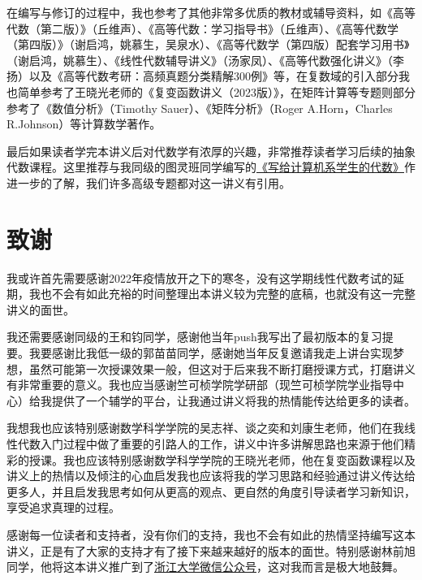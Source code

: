 在编写与修订的过程中，我也参考了其他非常多优质的教材或辅导资料，如《高等代数（第二版）》（丘维声）、《高等代数：学习指导书》（丘维声）、《高等代数学（第四版）》（谢启鸿，姚慕生，吴泉水）、《高等代数学（第四版）配套学习用书》（谢启鸿，姚慕生）、《线性代数辅导讲义》（汤家凤）、《高等代数强化讲义》（李扬）以及《高等代数考研：高频真题分类精解300例》等，在复数域的引入部分我也简单参考了王晓光老师的《复变函数讲义（2023版）》，在矩阵计算等专题则部分参考了《数值分析》（Timothy Sauer）、《矩阵分析》（Roger A.Horn，Charles R.Johnson）等计算数学著作。

最后如果读者学完本讲义后对代数学有浓厚的兴趣，非常推荐读者学习后续的抽象代数课程。这里推荐与我同级的图灵班同学编写的\href{https://frightenedfoxcn.github.io/notes/series/alg-for-cs/}{《写给计算机系学生的代数》}作进一步的了解，我们许多高级专题都对这一讲义有引用。

\section*{致谢}

我或许首先需要感谢2022年疫情放开之下的寒冬，没有这学期线性代数考试的延期，我也不会有如此充裕的时间整理出本讲义较为完整的底稿，也就没有这一完整讲义的面世。

我还需要感谢同级的王和钧同学，感谢他当年push我写出了最初版本的复习提要。我要感谢比我低一级的郭苗苗同学，感谢她当年反复邀请我走上讲台实现梦想，虽然可能第一次授课效果一般，但这对于后来我不断打磨授课方式，打磨讲义有非常重要的意义。我也应当感谢竺可桢学院学研部（现竺可桢学院学业指导中心）给我提供了一个辅学的平台，让我通过讲义将我的热情能传达给更多的读者。

我想我也应该特别感谢数学科学学院的吴志祥、谈之奕和刘康生老师，他们在我线性代数入门过程中做了重要的引路人的工作，讲义中许多讲解思路也来源于他们精彩的授课。我也应该特别感谢数学科学学院的王晓光老师，他在复变函数课程以及讲义上的热情以及倾注的心血启发我也应该将我的学习思路和经验通过讲义传达给更多人，并且启发我思考如何从更高的观点、更自然的角度引导读者学习新知识，享受追求真理的过程。

感谢每一位读者和支持者，没有你们的支持，我也不会有如此的热情坚持编写这本讲义，正是有了大家的支持才有了接下来越来越好的版本的面世。特别感谢林前旭同学，他将这本讲义推广到了\href{https://mp.weixin.qq.com/s/nOQ0xzJ0mX2_8JclcKiWdA}{浙江大学微信公众号}，这对我而言是极大地鼓舞。

